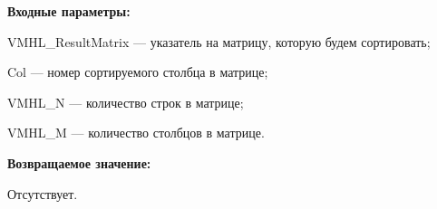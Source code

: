 \textbf{Входные параметры:}
 
VMHL\_ResultMatrix --- указатель на матрицу, которую будем сортировать;
 
Col --- номер сортируемого столбца в матрице;
 
VMHL\_N --- количество строк в матрице;
 
VMHL\_M --- количество столбцов в матрице.

\textbf{Возвращаемое значение:}

Отсутствует.